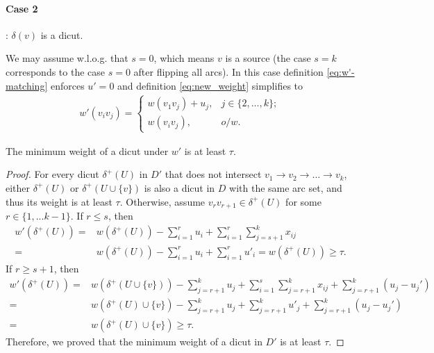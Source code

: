 \documentclass[runningheads]{llncs}
\begin{document}
\paragraph{\textbf{Case 2}}: $\delta(v)$ is a dicut.

We may assume w.l.o.g. that $s=0$, which means $v$ is a source (the case $s = k$ corresponds to
the case $s = 0$ after flipping all arcs). In this case definition \eqref{eq:w'-matching} enforces $u'=0$ and definition \eqref{eq:new_weight} simplifies to
\[\begin{aligned}
        w'(v_iv_j)=\begin{cases}
         w(v_1v_j)+u_j, & j\in\{2,...,k\};\\
        w(v_iv_j), & o/w.
    \end{cases}
    \end{aligned}
\]



    \begin{theorem}\label{thm:weight_tau}
        The minimum weight of a dicut under $w'$ is at least $\tau$.
    \end{theorem}
    \begin{proof}
    For every dicut $\delta^+(U)$ in $D'$ that does not intersect $v_1\rightarrow v_2\rightarrow\ldots\rightarrow v_k$, either $\delta^+(U)$ or $\delta^+(U\cup \{v\})$ is also a dicut in $D$ with the same arc set, and thus its weight is at least $\tau$. Otherwise, assume $v_rv_{r+1}\in\delta^+(U)$ for some $r\in\{1,...k-1\}$. If $r\leq s$, then 
    \[
    \begin{aligned}
    w'(\delta^+(U))=&w(\delta^+(U))-\sum_{i=1}^r u_i+\sum_{i=1}^r\sum_{j=s+1}^k x_{ij}\\
    =&w(\delta^+(U))-\sum_{i=1}^r u_i+\sum_{i=1}^r u'_i=w(\delta^+(U))\geq \tau. 
    \end{aligned}
    \] 
    If $r\geq s+1$, then 
    \[
    \begin{aligned}
            w'(\delta^+(U))=&w(\delta^+(U\cup \{v\}))-\sum_{j=r+1}^k u_j+\sum_{i=1}^s\sum_{j=r+1}^k x_{ij}+\sum_{j=r+1}^k (u_j-u_j')\\
            =&w(\delta^+(U)\cup \{v\})-\sum_{j=r+1}^k u_j+\sum_{j=r+1}^k u'_j+\sum_{j=r+1}^k (u_j-u_j')\\
            =&w(\delta^+(U)\cup \{v\})\geq \tau.
    \end{aligned}
    \]
    Therefore, we proved that the minimum weight of a dicut in $D'$ is at least $\tau$.
\end{proof}
\end{document}
